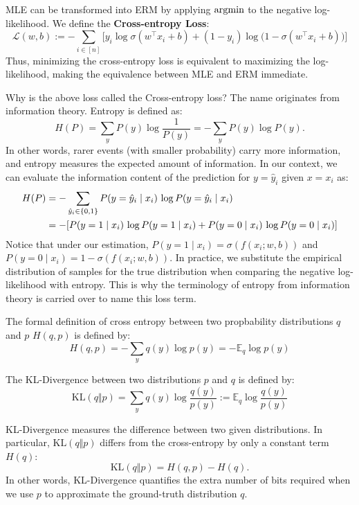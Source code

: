 \documentclass[../main]{subfiles}
\begin{document}
MLE can be transformed into ERM by applying $\mathop{\mathrm{argmin}}$ to the negative log-likelihood. We define the \textbf{Cross-entropy Loss}:
\begin{equation}
    \mathcal{L}(w,b) 
    := - \sum_{i \in [n]} \Big[ 
      y_i \log \sigma(w^\top x_i + b) 
      + (1-y_i) \log \big(1 - \sigma(w^\top x_i + b)\big) 
    \Big]
\end{equation}
Thus, minimizing the cross-entropy loss is equivalent to maximizing the log-likelihood, making the equivalence between MLE and ERM immediate.
\begin{note}
  Why is the above loss called the {Cross-entropy loss}? 
  The name originates from information theory. 
  Entropy is defined as:
  \begin{equation}
      H(P) = \sum_y P(y)\log\frac{1}{P(y)} 
           = -\sum_y P(y)\log P(y).
  \end{equation}
  In other words, rarer events (with smaller probability) carry more information, 
  and entropy measures the expected amount of information. In our context, we can evaluate the information content of the prediction 
  for $y = \hat y_i$ given $x = x_i$ as:
  \begin{align}
      H(P) &= - \sum_{\hat y_i \in \{0,1\}} 
      P(y=\hat y_i \mid x_i)\,\log P(y=\hat y_i \mid x_i)\notag\\
      &=-[P(y=1\mid x_i)\,\log P(y=1\mid x_i)+P(y=0 \mid x_i)\,\log P(y=0 \mid x_i)]
  \end{align}
  Notice that under our estimation, $P(y=1 \mid x_i) = \sigma(f(x_i; w,b))$ and $P(y=0 \mid x_i) = 1 - \sigma(f(x_i; w,b))$. In practice, we substitute the empirical distribution of samples for the true distribution when comparing the negative log-likelihood with entropy. This is why the terminology of entropy from information theory is carried over to name this loss term.
\end{note}
\begin{note}
  The formal definition of cross entropy between two propbability distributions $q$ and $p$ $H(q,p)$ is defined by:
  \begin{equation}
      H(q,p)=-\sum_y q(y)\log p(y)=-\mathbb E_q\log p(y)
  \end{equation}
\end{note}
\begin{definition}[KL-Divergence]
  The KL-Divergence between two distributions $p$ and $q$ is defined by:
    \begin{equation}
        \mathrm{KL}(q\Vert p)=\sum_y q(y)\log\frac{q(y)}{p(y)}:=\mathbb E_q\log\frac{q(y)}{p(y)}
    \end{equation}
\end{definition}
KL-Divergence measures the difference between two given distributions. 
In particular, $\mathrm{KL}(q \Vert p)$ differs from the cross-entropy by only a constant term $H(q)$:
\begin{equation}
  \mathrm{KL}(q \Vert p) = H(q, p) - H(q).
\end{equation}
In other words, KL-Divergence quantifies the extra number of bits required when we use $p$ to approximate the ground-truth distribution $q$.
\end{document}

